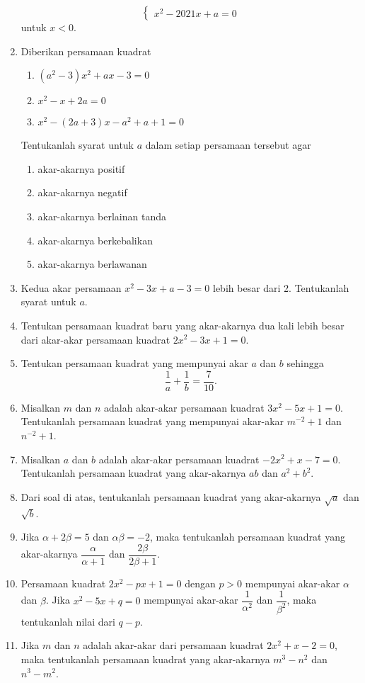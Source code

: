 \begin{enumerate}[nosep]
\[\begin{cases}
					x^{2} - 2021x + a = 0
				\end{cases}
			\]
			untuk $ x < 0 $.
			\item Diberikan persamaan kuadrat
			\begin{enumerate}[label=(\roman*)]
				\item $ \left(a^{2} - 3\right)x^{2} + ax - 3 = 0 $
				\item $ x^{2} - x + 2a = 0 $
				\item $ x^{2} - \left(2a + 3\right)x - a^{2} + a + 1 = 0 $
			\end{enumerate}
			Tentukanlah syarat untuk $ a $ dalam setiap persamaan tersebut agar
			\begin{multcols}
				\begin{enumerate}
					\item akar-akarnya positif
					\item akar-akarnya negatif
					\item akar-akarnya berlainan tanda
					\item akar-akarnya berkebalikan
					\item akar-akarnya berlawanan
				\end{enumerate}
			\end{multcols}
			\item Kedua akar persamaan $ x^{2} - 3x + a - 3 = 0 $ lebih besar dari 2. Tentukanlah syarat untuk $ a $.
			\item Tentukan persamaan kuadrat baru yang akar-akarnya dua kali lebih besar dari akar-akar persamaan kuadrat $ 2x^{2} - 3x + 1 = 0 $.
			\item Tentukan persamaan kuadrat yang mempunyai akar $ a $ dan $ b $ sehingga
			\[ \frac{1}{a} + \frac{1}{b} = \frac{7}{10}. \]
			\item Misalkan $ m $ dan $ n $ adalah akar-akar persamaan kuadrat $ 3x^{2} - 5x + 1 = 0 $. Tentukanlah persamaan kuadrat yang mempunyai akar-akar $ m^{-2} + 1 $ dan $ n^{-2} + 1 $.
			\item Misalkan $ a $ dan $ b $ adalah akar-akar persamaan kuadrat $ -2x^{2} + x - 7 = 0 $. Tentukanlah persamaan kuadrat yang akar-akarnya $ ab $ dan $ a^{2} + b^{2} $.
			\item Dari soal di atas, tentukanlah persamaan kuadrat yang akar-akarnya $ \sqrt{a} $ dan $ \sqrt{b} $.
			\item Jika $ \alpha  + 2\beta = 5 $ dan $ \alpha\beta = -2 $, maka tentukanlah persamaan kuadrat yang akar-akarnya $ \dfrac{\alpha}{\alpha + 1} $ dan $ \dfrac{2\beta}{2\beta + 1} $.
			\item Persamaan kuadrat $ 2x^{2} - px + 1 = 0 $ dengan $ p > 0 $ mempunyai akar-akar $ \alpha $ dan $ \beta $. Jika $ x^{2} - 5x + q = 0 $ mempunyai akar-akar $ \dfrac{1}{\alpha^{2}} $ dan $ \dfrac{1}{\beta^{2}} $, maka tentukanlah nilai dari $ q - p $.
			\item Jika $ m $ dan $ n $ adalah akar-akar dari persamaan kuadrat $ 2x^{2} + x - 2 = 0 $, maka tentukanlah persamaan kuadrat yang akar-akarnya $ m^{3} - n^{2} $ dan $ n^{3} - m^{2} $.
		\end{enumerate}
	
